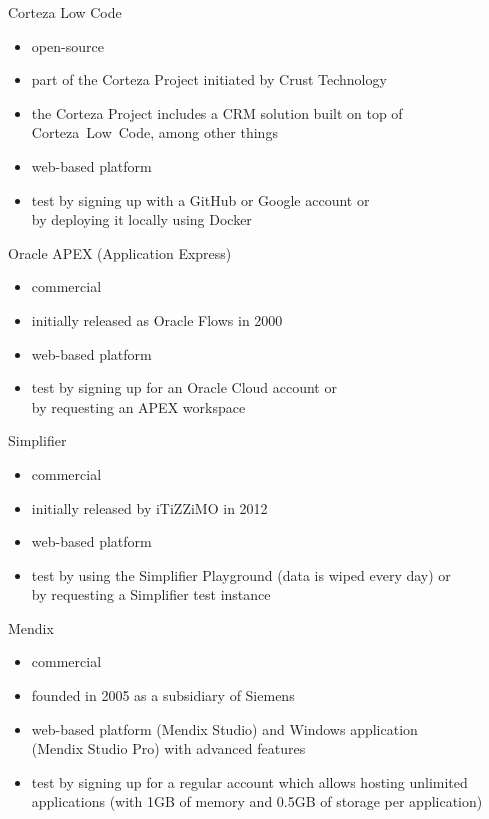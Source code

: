 \documentclass[aspectratio=169]{beamer}
\begin{document}
  \begin{frame}{Corteza Low Code}
    \begin{itemize}
      \item open-source
      \item part of the Corteza Project initiated by Crust Technology
      \item the Corteza Project includes a CRM solution built on top of Corteza~Low~Code, among other things
      \item web-based platform
      \item test by signing up with a GitHub or Google account or \\
            by deploying it locally using Docker
    \end{itemize}
  \end{frame}

  \begin{frame}{Oracle APEX (Application Express)}
    \begin{itemize}
      \item commercial
      \item initially released as Oracle Flows in 2000
      \item web-based platform
      \item test by signing up for an Oracle Cloud account or \\
            by requesting an APEX workspace
    \end{itemize}
  \end{frame}

  \begin{frame}{Simplifier}
    \begin{itemize}
      \item commercial
      \item initially released by iTiZZiMO in 2012
      \item web-based platform
      \item test by using the Simplifier Playground (data is wiped every day) or \\
            by requesting a Simplifier test instance
    \end{itemize}
  \end{frame}

  \begin{frame}{Mendix}
    \begin{itemize}
      \item commercial
      \item founded in 2005 as a subsidiary of Siemens
      \item web-based platform (Mendix Studio) and Windows application \\
            (Mendix Studio Pro) with advanced features
      \item test by signing up for a regular account which allows hosting unlimited applications (with 1GB of memory and 0.5GB of storage per application)
    \end{itemize}
  \end{frame}
\end{document}
